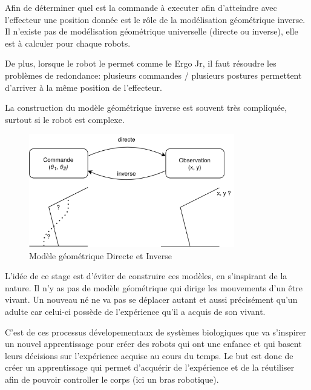 \documentclass[11pt,french]{report}
\begin{document}
\phantom{INVISIBLE LINE}

Afin de déterminer quel est la commande à executer afin d'atteindre avec l'effecteur une position donnée est le rôle de la modélisation géométrique inverse.
Il n'existe pas de modélisation géométrique universelle (directe ou inverse), elle est à calculer pour chaque robots.

De plus, lorsque le robot le permet comme le Ergo Jr, il faut résoudre les problèmes de redondance: plusieurs commandes / plusieurs postures permettent d'arriver à la même position de l'effecteur.

La construction du modèle géométrique inverse est souvent très compliquée, surtout si le robot est complexe.


\begin{figure}
    \centering
    \includegraphics[height=140pt]{Modelisation_geometrique_diagram} 
    \caption{Modèle géométrique Directe et Inverse}
    \label{fig:SchemaModelisation}
\end{figure}

\phantom{INVISIBLE LINE}

L'idée de ce stage est d'éviter de construire ces modèles, en s'inspirant de la nature.
Il n'y as pas de modèle géométrique qui dirige les mouvements d'un être vivant.
Un nouveau né ne va pas se déplacer autant et aussi précisément qu'un adulte car celui-ci possède de l'expérience qu'il a acquis de son vivant.

C'est de ces processus dévelopementaux de systèmes biologiques que va s'inspirer un nouvel apprentissage pour créer des robots qui ont une enfance et qui basent leurs décisions sur l'expérience acquise au cours du temps.
Le but est donc de créer un apprentissage qui permet d'acquérir de l'expérience et de la réutiliser afin de pouvoir controller le corps (ici un bras robotique).

\end{document}
